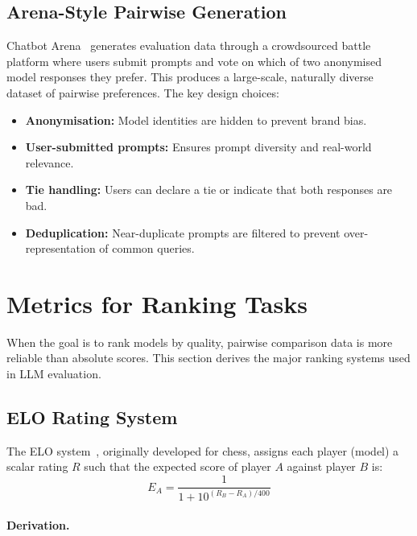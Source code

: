 \subsection{Arena-Style Pairwise Generation}
\label{arena-style-pairwise-generation}

Chatbot Arena~\cite{zheng2023judging} generates evaluation data through a crowdsourced battle platform where users submit prompts and vote on which of two anonymised model responses they prefer. This produces a large-scale, naturally diverse dataset of pairwise preferences. The key design choices:

\begin{itemize}
  \item \textbf{Anonymisation:} Model identities are hidden to prevent brand bias.
  \item \textbf{User-submitted prompts:} Ensures prompt diversity and real-world relevance.
  \item \textbf{Tie handling:} Users can declare a tie or indicate that both responses are bad.
  \item \textbf{Deduplication:} Near-duplicate prompts are filtered to prevent over-representation of common queries.
\end{itemize}

\section{Metrics for Ranking Tasks}
\label{subsec:ranking-metrics}

When the goal is to rank models by quality, pairwise comparison data is more reliable than absolute scores. This section derives the major ranking systems used in LLM evaluation.

\subsection{ELO Rating System}
\label{elo-rating-system}

The ELO system~\cite{elo1978rating}, originally developed for chess, assigns each player (model) a scalar rating $R$ such that the expected score of player $A$ against player $B$ is: 
\begin{equation}
    E_A = \frac{1}{1 + 10^{(R_B - R_A)/400}}
\end{equation}

\paragraph{Derivation.}
\label{derivation.}

